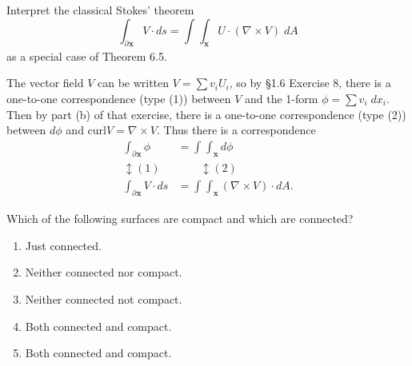 \documentclass[10pt]{report}
\begin{document}
\begin{exer}[4.6: 13]
Interpret the classical Stokes' theorem
\[
	\int_{\partial_{}{\mathbf{x}} } V\cdot ds = \int_{} \int_{\mathbf{x}} U \cdot (\nabla_{}\times V) \; dA
\] as a special case of Theorem 6.5.
\end{exer}
The vector field $V$ can be written $V = \sum v_i U_i$, so by \S 1.6 Exercise 8, there is a one-to-one correspondence (type (1)) between $V$ and the 1-form $\phi = \sum v_i \;dx_i$. Then by part (b) of that exercise, there is a one-to-one correspondence (type (2)) between $d\phi$ and $\text{curl} V = \nabla_{}\times V$. Thus there is a correspondence
\begin{align*}
	\int_{\partial_{}{\mathbf{x}} } \phi &= \int_{} \int_{\mathbf{x}} d\phi \\
	\updownarrow (1) & \quad\quad\updownarrow (2) \\
	\int_{\partial_{}{\mathbf{x}} } V \cdot ds &= \int_{} \int_{\mathbf{x}} (\nabla_{}\times V)\cdot dA.
\end{align*}

\begin{exer}[4.7: 1]
Which of the following surfaces are compact and which are connected?
\end{exer}
\begin{enumerate}
	\item Just connected.
	\item Neither connected nor compact.
	\item Neither connected not compact.
	\item Both connected and compact.
	\item Both connected and compact.
\end{enumerate}
\pagebreak
\end{document}
